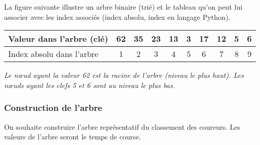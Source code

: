\documentclass[10pt,fleqn]{article} %
\begin{document}
\begin{multicols}{2}
La figure suivante illustre un arbre binaire (trié) et le tableau qu'on peut lui associer avec les index associés (index absolu, index en langage Python).%

\footnotesize{
\begin{center}
\end{center}}



\footnotesize{
\begin{center}
\begin{tabular}{|m{1.75cm}|c|c|c|c|c|c|c|c|c|}
\hline
Valeur dans l'arbre (clé) & 62 & 35 & 23 & 13 & 3 & 17 & 12 & 5 & 6 \\
\hline \hline
Index absolu dans l'arbre & 1 & 2 & 3 & 4 & 5 & 6 & 7 & 8 & 9 \\ \hline
\end{tabular}
\end{center}
}
\textit{Le nœud ayant la valeur 62 est la racine de l'arbre (niveau le plus haut). Les nœuds ayant les clefs 5 et 6 sont au niveau le plus bas.}

\normalsize

\subsubsection*{Construction de l'arbre}
On souhaite construire l'arbre représentatif du classement des coureurs. Les valeurs de l'arbre seront le temps de course.


\end{multicols}
\end{document}
